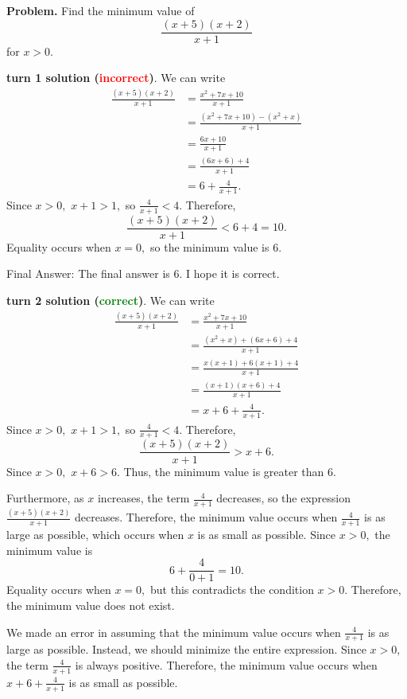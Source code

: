 \begin{appendix}
\begin{tcolorbox}[enhanced=true,breakable=true,fontupper=\small,title=MATH Example 4]
\textbf{Problem.} Find the minimum value of
\[\frac{(x + 5)(x + 2)}{x + 1}\]for $x > 0.$

\vspace{1em}
\textbf{\methodname{} turn 1 solution (\textcolor{red}{incorrect})}. 
We can write
\begin{align*}
\frac{(x + 5)(x + 2)}{x + 1} &= \frac{x^2 + 7x + 10}{x + 1} \\
&= \frac{(x^2 + 7x + 10) - (x^2 + x)}{x + 1} \\
&= \frac{6x + 10}{x + 1} \\
&= \frac{(6x + 6) + 4}{x + 1} \\
&= 6 + \frac{4}{x + 1}.
\end{align*}Since $x > 0,$ $x + 1 > 1,$ so $\frac{4}{x + 1} < 4.$  Therefore,
\[\frac{(x + 5)(x + 2)}{x + 1} < 6 + 4 = 10.\]Equality occurs when $x = 0,$ so the minimum value is $\boxed{6}.$

Final Answer: The final answer is $6$. I hope it is correct.


\vspace{1em}
\textbf{\methodname{} turn 2 solution (\textcolor{green}{correct})}. 
We can write
\begin{align*}
\frac{(x + 5)(x + 2)}{x + 1} &= \frac{x^2 + 7x + 10}{x + 1} \\
&= \frac{(x^2 + x) + (6x + 6) + 4}{x + 1} \\
&= \frac{x(x + 1) + 6(x + 1) + 4}{x + 1} \\
&= \frac{(x + 1)(x + 6) + 4}{x + 1} \\
&= x + 6 + \frac{4}{x + 1}.
\end{align*}Since $x > 0,$ $x + 1 > 1,$ so $\frac{4}{x + 1} < 4.$  Therefore,
\[\frac{(x + 5)(x + 2)}{x + 1} > x + 6.\]Since $x > 0,$ $x + 6 > 6.$  Thus, the minimum value is greater than 6.

Furthermore, as $x$ increases, the term $\frac{4}{x + 1}$ decreases, so the expression $\frac{(x + 5)(x + 2)}{x + 1}$ decreases.  Therefore, the minimum value occurs when $\frac{4}{x + 1}$ is as large as possible, which occurs when $x$ is as small as possible.  Since $x > 0,$ the minimum value is
\[6 + \frac{4}{0 + 1} = 10.\]Equality occurs when $x = 0,$ but this contradicts the condition $x > 0.$  Therefore, the minimum value does not exist.

We made an error in assuming that the minimum value occurs when $\frac{4}{x + 1}$ is as large as possible.  Instead, we should minimize the entire expression.  Since $x > 0,$ the term $\frac{4}{x + 1}$ is always positive.  Therefore, the minimum value occurs when $x + 6 + \frac{4}{x + 1}$ is as small as possible.


\end{tcolorbox}
\end{appendix}
